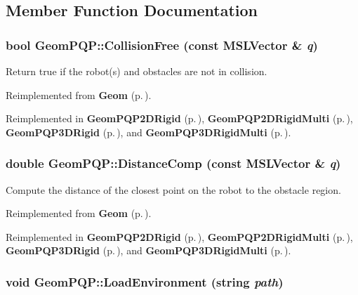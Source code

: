 \subsection{Member Function Documentation}
\subsubsection{\setlength{\rightskip}{0pt plus 5cm}bool Geom\-PQP::Collision\-Free (const {\bf MSLVector} \& {\em q})\hspace{0.3cm}{\tt  [inline, virtual]}}\label{classGeomPQP_a4}


Return true if the robot(s) and obstacles are not in collision.



Reimplemented from {\bf Geom} {\rm (p.\,\pageref{classGeom_a2})}.

Reimplemented in {\bf Geom\-PQP2DRigid} {\rm (p.\,\pageref{classGeomPQP2DRigid_a2})}, {\bf Geom\-PQP2DRigid\-Multi} {\rm (p.\,\pageref{classGeomPQP2DRigidMulti_a2})}, {\bf Geom\-PQP3DRigid} {\rm (p.\,\pageref{classGeomPQP3DRigid_a2})}, and {\bf Geom\-PQP3DRigid\-Multi} {\rm (p.\,\pageref{classGeomPQP3DRigidMulti_a2})}.
\subsubsection{\setlength{\rightskip}{0pt plus 5cm}double Geom\-PQP::Distance\-Comp (const {\bf MSLVector} \& {\em q})\hspace{0.3cm}{\tt  [inline, virtual]}}\label{classGeomPQP_a5}


Compute the distance of the closest point on the robot to the obstacle region.



Reimplemented from {\bf Geom} {\rm (p.\,\pageref{classGeom_a3})}.

Reimplemented in {\bf Geom\-PQP2DRigid} {\rm (p.\,\pageref{classGeomPQP2DRigid_a3})}, {\bf Geom\-PQP2DRigid\-Multi} {\rm (p.\,\pageref{classGeomPQP2DRigidMulti_a3})}, {\bf Geom\-PQP3DRigid} {\rm (p.\,\pageref{classGeomPQP3DRigid_a3})}, and {\bf Geom\-PQP3DRigid\-Multi} {\rm (p.\,\pageref{classGeomPQP3DRigidMulti_a3})}.
\subsubsection{\setlength{\rightskip}{0pt plus 5cm}void Geom\-PQP::Load\-Environment (string {\em path})\hspace{0.3cm}{\tt  [virtual]}}\label{classGeomPQP_a2}





